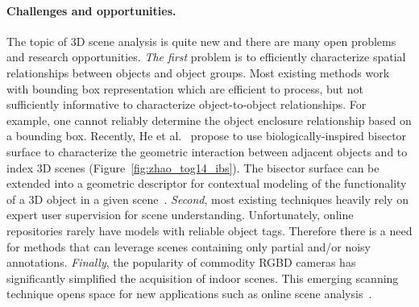 \paragraph*{Challenges and opportunities.}
The topic of 3D scene analysis is quite new and there are many open problems and research opportunities.
\emph{The first} problem is to efficiently characterize spatial relationships between objects and object groups. Most existing methods work with bounding box representation which are efficient to process, but not sufficiently informative to characterize object-to-object relationships.
For example, one cannot reliably determine the object enclosure relationship based on a bounding box.
Recently, He et al.~ propose to use biologically-inspired bisector surface to characterize the
geometric interaction between adjacent objects and to index 3D scenes (Figure~\ref{fig:zhao_tog14_ibs}).
The bisector surface can be extended into a geometric descriptor for contextual modeling of the functionality of a 3D object in a given scene~\cite{hu:icon:2015}.
%
\emph{Second}, most existing techniques heavily rely on expert user supervision for scene understanding. Unfortunately, online repositories rarely have models with reliable object tags. Therefore there is a need for methods that can leverage scenes containing only partial and/or noisy annotations.
%
\emph{Finally}, the popularity of commodity RGBD cameras has significantly simplified the acquisition of indoor scenes. This emerging scanning technique opens space for new applications such as online scene analysis~\cite{Zhang:2014:OSA,Xu:2015:ACS}.  %




